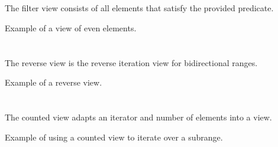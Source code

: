 \section{\texorpdfstring{}{\texttt{std::views::filter}}}

The filter view consists of all elements that satisfy the provided predicate.

\begin{codebox}[breakable]{\href{https://compiler-explorer.com/z/4hYba6qf3}{\ExternalLink}}
\footnotesize Example of a view of even elements.
\tcblower
{}
\end{codebox}

\section{\texorpdfstring{}{\texttt{std::views::reverse}}}

The reverse view is the reverse iteration view for bidirectional ranges.

\begin{codebox}[]{\href{https://compiler-explorer.com/z/eY7ohjGTM}{\ExternalLink}}
\footnotesize Example of a reverse view.
\tcblower
{}
\end{codebox}

\section{\texorpdfstring{}{\texttt{std::views::counted}}}

The counted view adapts an iterator and number of elements into a view.

\begin{codebox}[]{\href{https://compiler-explorer.com/z/rcfe69aEo}{\ExternalLink}}
\footnotesize Example of using a counted view to iterate over a subrange.
\tcblower
{}
\end{codebox}

\section{\texorpdfstring{}{\texttt{std::views::common}}}

